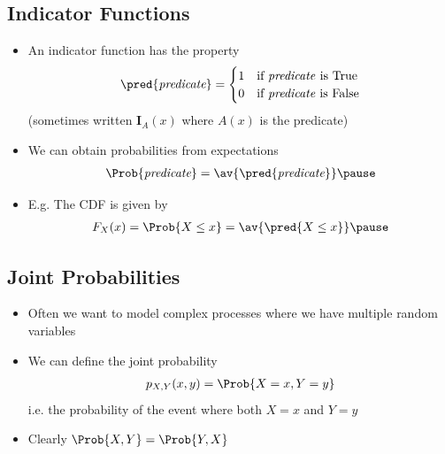 \begin{slide}
\section{Indicator Functions}

\begin{PauseHighLight}
  \begin{itemize}
  \item An indicator function has the property
    \begin{align*}
      \pred{\text{\it predicate}} =
      \begin{cases}
        1 & \text{if \textit{predicate }is True}\\
        0 & \text{if \textit{predicate} is False}
      \end{cases}
    \end{align*}
    (sometimes written $\bm{I}_A(x)$ where $A(x)$ is the predicate)\pause
  \item We can obtain probabilities from expectations
    \begin{align*}
      \Prob{\text{\it predicate}} = \av{\pred{\text{\it predicate}}}\pause
    \end{align*}
  \item E.g. The CDF is given by
    \begin{align*}
      F_X(x) = \Prob{X\leq x} = \av{\pred{X\leq x}}\pause
    \end{align*}
  \end{itemize}
\end{PauseHighLight}

\end{slide}


\Outline %

\begin{slide}
\section{Joint Probabilities}
  
\begin{PauseHighLight}
  \begin{itemize}
  \item Often we want to model complex processes where we have
    multiple random variables\pause
  \item We can define the joint probability
    \begin{align*}
      p_{X,Y}(x, y) = \Prob{X=x, Y=y}
    \end{align*}
    i.e. the probability of the event where both $X=x$ and $Y=y$\pause
  \item Clearly $\Prob{X,Y} = \Prob{Y,X}$\pause
  \end{itemize}
\end{PauseHighLight}
\end{slide}

